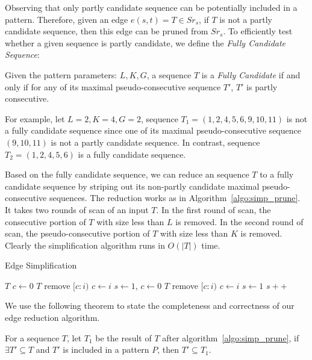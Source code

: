 Observing that only partly candidate sequence can be potentially included in a 
pattern. Therefore, given an edge $e(s,t)=T \in Sr_s$, if $T$ is not a partly
candidate sequence, then this edge can be pruned from $Sr_s$. To efficiently
test whether a given sequence is partly candidate, we define the \emph{Fully Candidate Sequence}:

\begin{definition}
Given the pattern parameters: $L,K,G$, a sequence $T$ is a \emph{Fully Candidate} 
if and only if for any of its maximal pseudo-consecutive sequence $T'$, $T'$ 
is partly consecutive.
\end{definition}

For example, let $L = 2, K = 4, G = 2$, sequence $T_1=(1,2,4,5,6,9,10,11)$ is 
not a fully candidate sequence since one of its maximal pseudo-consecutive sequence $(9,10,11)$
is not a partly candidate sequence. In contrast, sequence $T_2=(1,2,4,5,6)$ is 
a fully candidate sequence.

Based on the fully candidate sequence, we can reduce an sequence $T$ to a 
fully candidate sequence by striping out its non-partly candidate maximal pseudo-consecutive 
sequences. The reduction works as in Algorithm~\ref{algo:simp_prune}. It takes two
rounds of scan of an input $T$. In the first round of scan,
the consecutive portion of $T$ with size less than $L$ is removed.
In the second round of scan, the pseudo-consecutive portion of $T$ with size less than $K$
is removed. Clearly the simplification algorithm runs in $O(|T|)$ time.

\begin{algorithm}
\caption{Edge Simplification}
\label{algo:simp_prune}
\begin{algorithmic}
\Require $T$
\State $c \gets 0$
			\State $T$ remove $[c:i)$
		\EndIf
		\State $c \gets i$
	\EndIf
\EndFor
{}
\State $s\gets 1$, $c\gets 0$
			\State $T$ remove $[c:i)$
		\EndIf
		\State $c \gets i$
		\State $s \gets 1$
	\Else
		\State $s++$
	\EndIf
\EndFor
\end{algorithmic}
\end{algorithm}

We use the following theorem to state the completeness and correctness of our 
edge reduction algorithm.
\begin{theorem}
For a sequence $T$, let $T_1$ be the result of $T$ after algorithm~\ref{algo:simp_prune},
if $\exists T' \subseteq T$ and $T'$ is included in a pattern $P$, then $T' \subseteq T_1$.
\end{theorem}


